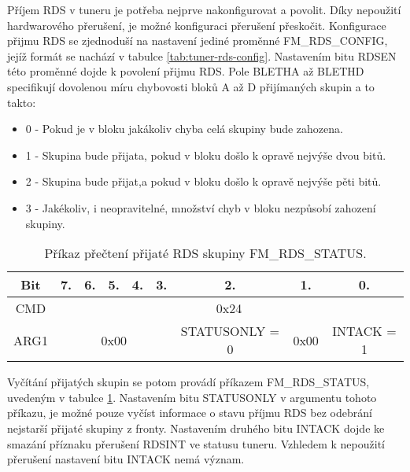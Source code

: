 Příjem RDS v tuneru je potřeba nejprve nakonfigurovat a povolit. Díky nepoužití hardwarového přerušení, je možné konfiguraci přerušení přeskočit. Konfigurace přijmu RDS se zjednoduší na nastavení jediné proměnné FM\_RDS\_CONFIG, jejíž formát se nachází v tabulce \ref{tab:tuner-rds-config}. Nastavením bitu RDSEN této proměnné dojde k povolení přijmu RDS. Pole BLETHA až BLETHD specifikují dovolenou míru chybovosti bloků A až D přijímaných skupin a to takto:

\begin{itemize}
\item 0 - Pokud je v bloku jakákoliv chyba celá skupiny bude zahozena.
\item 1 - Skupina bude přijata, pokud v bloku došlo k opravě nejvýše dvou bitů. 
\item 2 - Skupina bude přijat,a pokud v bloku došlo k opravě nejvýše pěti bitů.
\item 3 - Jakékoliv, i neopravitelné, množství chyb v bloku nezpůsobí zahození skupiny.
\end{itemize}

\begin{table}[ht!]
\begin{center}
\begin{tabular}{|c|c|c|c|c|c|c|c|c|}
\hline 
Bit & 7. & 6. & 5. & 4. & 3. & 2. & 1. & 0. \\ 
\hline 
CMD & \multicolumn{8}{c|}{0x24} \\ 
\hline 
ARG1 & \multicolumn{5}{c|}{0x00} & STATUSONLY = 0 & 0x00 & INTACK = 1 \\ 
\hline 
\end{tabular} 
\end{center}
\caption{Příkaz přečtení přijaté RDS skupiny FM\_RDS\_STATUS.}
\label{tab:tuner-rds-get} 
\end{table}

Vyčítání přijatých skupin se potom provádí příkazem FM\_RDS\_STATUS, uvedeným v tabulce \ref{tab:tuner-rds-get}. Nastavením bitu STATUSONLY v argumentu tohoto příkazu, je možné pouze vyčíst informace o stavu příjmu RDS bez odebrání nejstarší přijaté skupiny z fronty. Nastavením druhého bitu INTACK dojde ke smazání příznaku přerušení RDSINT ve statusu tuneru. Vzhledem k nepoužití přerušení nastavení bitu INTACK nemá význam.

